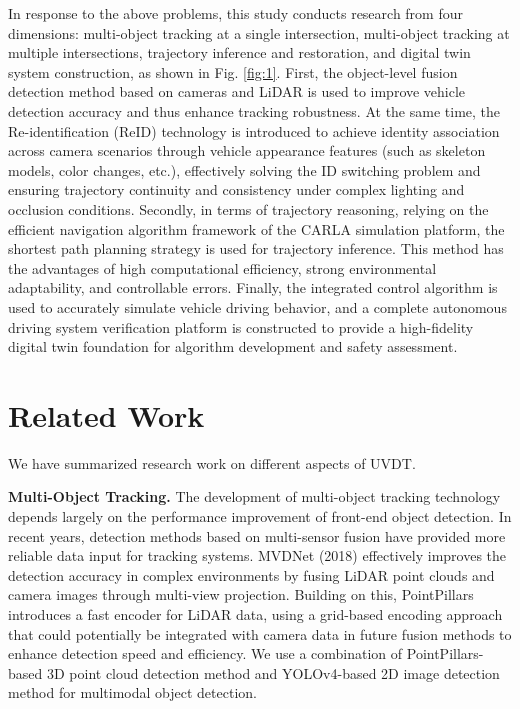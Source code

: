 \documentclass[journal,twoside,web]{ieeecolor}
\begin{document}
In response to the above problems, this study conducts research from four dimensions: multi-object tracking at a single intersection, multi-object tracking at multiple intersections, trajectory inference and restoration, and digital twin system construction, as shown in Fig. \ref{fig:1}. 
First, the object-level fusion detection method based on cameras and LiDAR is used to improve vehicle detection accuracy and thus enhance tracking robustness. 
At the same time, the Re-identification (ReID) technology is introduced to achieve identity association across camera scenarios through vehicle appearance features (such as skeleton models, color changes, etc.), effectively solving the ID switching problem and ensuring trajectory continuity and consistency under complex lighting and occlusion conditions\cite{Alpher23}. 
Secondly, in terms of trajectory reasoning, relying on the efficient navigation algorithm framework of the CARLA simulation platform, the shortest path planning strategy is used for trajectory inference. 
This method has the advantages of high computational efficiency, strong environmental adaptability, and controllable errors. 
Finally, the integrated control algorithm is used to accurately simulate vehicle driving behavior, and a complete autonomous driving system verification platform is constructed to provide a high-fidelity digital twin foundation for algorithm development and safety assessment\cite{Alpher24c}.

\section{Related Work}

We have summarized research work on different aspects of UVDT.

\textbf{Multi-Object Tracking.}
The development of multi-object tracking technology depends largely on the performance improvement of front-end object detection.
In recent years, detection methods based on multi-sensor fusion have provided more reliable data input for tracking systems.
MVDNet (2018) effectively improves the detection accuracy in complex environments by fusing LiDAR point clouds and camera images through multi-view projection\cite{Alpher22h}.
Building on this, PointPillars introduces a fast encoder for LiDAR data, using a grid-based encoding approach that could potentially be integrated with camera data in future fusion methods to enhance detection speed and efficiency\cite{Alpher19}.
We use a combination of PointPillars-based 3D point cloud detection method and YOLOv4-based 2D image detection method for multimodal object detection.
\end{document}
